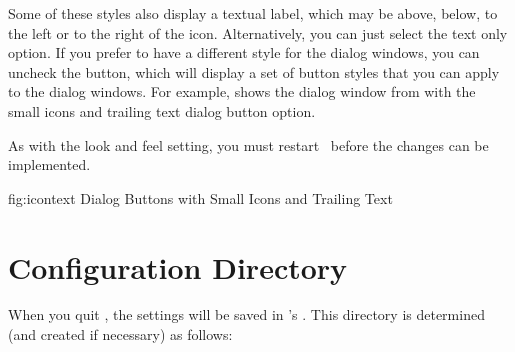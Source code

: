 Some of these styles also display a textual label, which may be
above, below, to the left or to the right of the icon.
Alternatively, you can just select the text only option. If you
prefer to have a different style for the dialog windows, you can
uncheck the  button,
which will display a set of button styles that you can apply to the
dialog windows. For example,  shows the
dialog window from  with the
small icons and trailing text dialog button option.

As with the look and feel setting, you must restart \FlowframTk\
before the changes can be implemented.

\FloatFig
  {fig:icontext}
  {}
  {Dialog Buttons with Small Icons and Trailing Text}


\section{Configuration Directory}\label{sec:configdir}


When you quit \FlowframTk, the settings will be saved in
\FlowframTk's .  This directory is
determined (and created if necessary) as follows:

